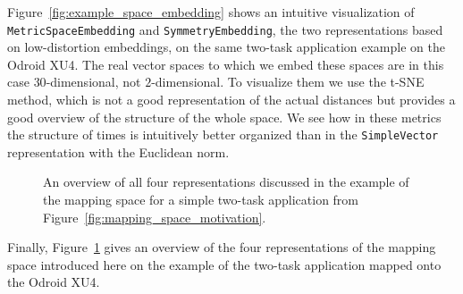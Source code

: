 Figure~\ref{fig:example_space_embedding} shows an intuitive visualization of \texttt{MetricSpaceEmbedding} and \texttt{SymmetryEmbedding}, the two representations based on low-distortion embeddings, on the same two-task application example on the Odroid XU4.
The real vector spaces to which we embed these spaces are in this case $30$-dimensional, not $2$-dimensional.
To visualize them we use the t-SNE\cite{tsne} method, which is not a good representation of the actual distances but provides a good overview of the structure of the whole space.
We see how in these metrics the structure of times is intuitively better organized than in the \texttt{SimpleVector} representation with the Euclidean norm. 

\begin{figure}[h]
	\centering
\resizebox{1.00\textwidth}{!}{
   \begin{tikzpicture}
     
   \end{tikzpicture}
 }
   \caption{An overview of all four representations discussed in the example of the mapping space for a simple two-task application from Figure~\ref{fig:mapping_space_motivation}.}
   \label{fig:mapping_space_full}
\end{figure}

Finally, Figure~\ref{fig:mapping_space_full} gives an overview of the four representations of the mapping space introduced here on the example of the two-task application mapped onto the Odroid XU4.